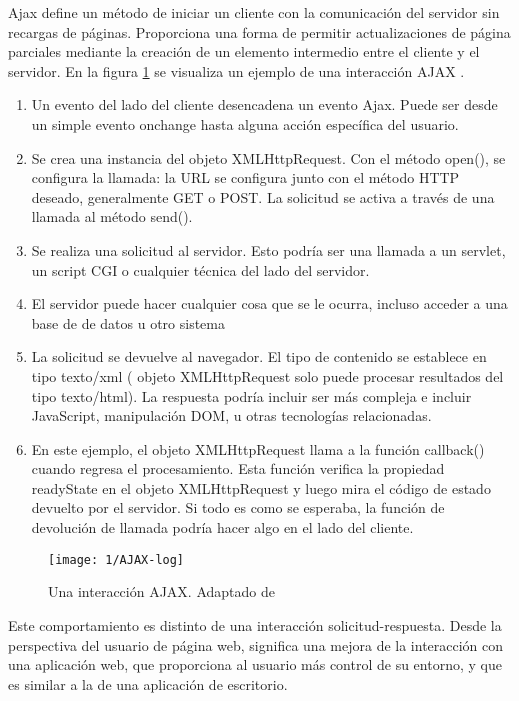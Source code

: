 Ajax define un método de iniciar un cliente con la comunicación del servidor sin recargas de páginas. Proporciona una forma de permitir actualizaciones de página parciales mediante la creación de un elemento intermedio entre el cliente y el servidor. En la figura \ref{fig:AJAX-how} se visualiza un ejemplo de una interacción AJAX . 
\begin{enumerate}
	\item  Un evento del lado del cliente desencadena un evento Ajax. Puede ser desde un simple evento onchange hasta alguna acción específica del usuario.
	
	\item Se crea una instancia del objeto XMLHttpRequest. Con el método open(), se configura la llamada: la URL se configura junto con el método HTTP deseado, generalmente GET o POST. La solicitud  se activa a través de una llamada al método send().
	
	\item Se realiza una solicitud al servidor. Esto podría ser una llamada a un servlet, un script CGI o cualquier 	técnica del lado del servidor.
	\item El servidor puede hacer cualquier cosa que se le ocurra, incluso acceder a una base de  de datos u	otro sistema
	\item La solicitud se devuelve al navegador. El tipo de contenido se establece en tipo texto/xml ( objeto XMLHttpRequest solo puede procesar resultados del tipo texto/html). La respuesta podría incluir ser más compleja e incluir JavaScript, manipulación DOM,
	u otras tecnologías relacionadas.
	\item En este ejemplo, el objeto XMLHttpRequest llama a la función callback() cuando regresa el procesamiento. Esta función verifica la propiedad readyState en el objeto XMLHttpRequest y luego mira el código de estado devuelto por el servidor. Si todo es como se esperaba, la función de devolución de llamada podría hacer algo en el  lado del cliente.
\end{enumerate}


\begin{figure} %
		\texttt{[image: 1/AJAX-log]}
	\caption{Una interacción AJAX. Adaptado de \AS}
	\label{fig:AJAX-how}
\end{figure}

Este comportamiento es distinto de una interacción solicitud-respuesta. Desde la perspectiva del usuario de página web, significa  una mejora de la interacción con una aplicación web, que proporciona al usuario más control de su entorno, y que es similar a la de una aplicación de escritorio.




